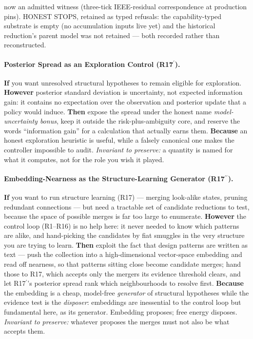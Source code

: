 {now an admitted witness (three-tick IEEE-residual correspondence at
production pins). HONEST STOPS, retained as typed refusals: the
capability-typed substrate is empty (no accumulation inputs live yet) and
the historical reduction's parent model was not retained --- both recorded
rather than reconstructed.}

\paragraph{Posterior Spread as an Exploration Control (R17\hspace{.1em}$^{\prime}$).} \textbf{If} you want unresolved structural hypotheses to remain eligible for exploration. \textbf{However} posterior standard deviation is uncertainty, not expected information gain: it contains no expectation over the observation and posterior update that a policy would induce. \textbf{Then} expose the spread under the honest name \emph{model-uncertainty bonus}, keep it outside the risk-plus-ambiguity core, and reserve the words ``information gain'' for a calculation that actually earns them. \textbf{Because} an honest exploration heuristic is useful, while a falsely canonical one makes the controller impossible to audit.  \emph{Invariant to preserve:} a quantity is named for what it computes, not for the role you wish it played.

\paragraph{Embedding-Nearness as the Structure-Learning Generator (R17\hspace{.1em}$^{\prime\prime}$).} \textbf{If} you want to run structure learning (R17) --- merging look-alike states, pruning redundant connections --- but need a tractable set of candidate reductions to test, because the space of possible merges is far too large to enumerate. \textbf{However} the control loop (R1--R16) is no help here: it never needed to know which patterns are alike, and hand-picking the candidates by fiat smuggles in the very structure you are trying to learn. \textbf{Then} exploit the fact that design patterns are written as text --- push the collection into a high-dimensional vector-space embedding and read off nearness, so that patterns sitting close become candidate merges; hand those to R17, which accepts only the mergers its evidence threshold clears, and let R17$^{\prime}$'s posterior spread rank which neighbourhoods to resolve first. \textbf{Because} the embedding is a cheap, model-free \emph{generator} of structural hypotheses while the evidence test is the \emph{disposer}: embeddings are inessential to the control loop but fundamental here, as its generator.  Embedding proposes; free energy disposes.  \emph{Invariant to preserve:} whatever proposes the merges must not also be what accepts them.

